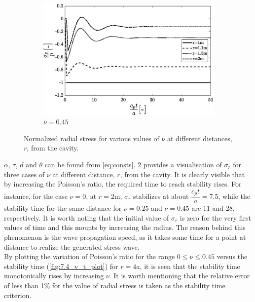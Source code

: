 \documentclass{article}
\begin{document}
\begin{figure}[!]
        \begin{subfigure}{0.64\textwidth}
            \includegraphics[width=1\linewidth]{figures/v0_45.eps} 
            \caption{$\nu = 0.45$}
            \label{fig:v0.45}
        \end{subfigure}
    \caption{Normalized radial stress for various values of $\nu$ at different distances, $r$, from the cavity.}
    \label{fig:7.4}
\end{figure}

$\alpha$, $\tau$, $d$ and $\theta$ can be found from \cref{eq:consts}. \cref{fig:7.4} provides a visualisation of $\sigma_r$ for three cases of $\nu$ at different distance, $r$, from the cavity. It is clearly visible that by increasing the Poisson's ratio, the required time to reach stability rises. For instance, for the case $\nu=0$, at $r = 2$m, $\sigma_r$ stabilizes at about $\dfrac{c_p t}{a}=$7.5, while the stability time for the same distance for $\nu=0.25$ and $\nu=0.45$ are 11 and 28, respectively. It is worth noting that the initial value of $\sigma_r$ is zero for the very first values of time and this mounts by increasing the radius. The reason behind this phenomenon is the wave propagation speed, as it takes some time for a point at distance to realize the generated stress wave. \\

By plotting the variation of Poisson's ratio for the range $0 \leq \nu \leq 0.45$ versus the stability time (\cref{fig:7.4_v_t_plot}) for $r=4a$, it is seen that the stability time monotonically rises by increasing $\nu$. It is worth mentioning that the relative error of less than 1\% for the value of radial stress is taken as the stability time criterion. \\
\end{document}
